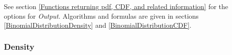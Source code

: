 \vspace{0.3cm}
See section \ref{Functions returning pdf, CDF, and related information} for the options for {\itshape\sffamily Output}. Algorithms and formulas are given in sections \ref{BinomialDistributionDensity} and \ref{BinomialDistributionCDF}.


%
%
%
%





\subsubsection{Density}
\label{BinomialDistributionDensity}


